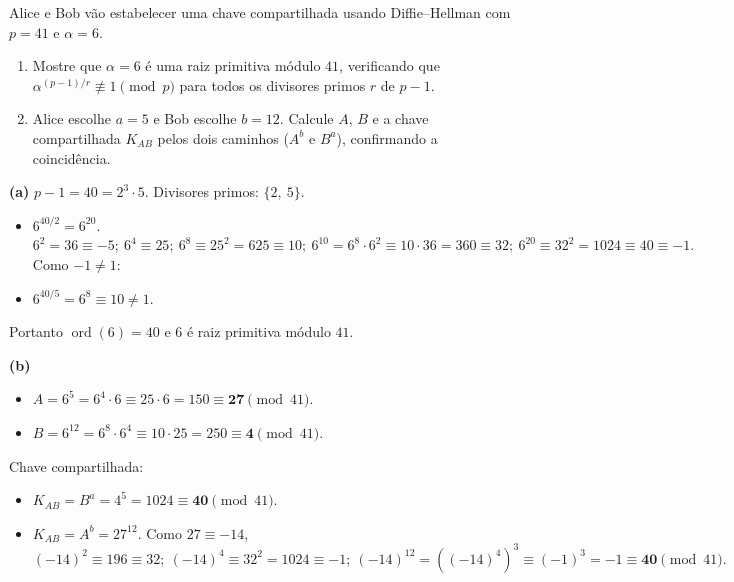 \documentclass[12pt,a4paper]{article}
\begin{document}
\begin{exercicio}
Alice e Bob v\~{a}o estabelecer uma chave compartilhada usando Diffie--Hellman com $p = 41$ e $\alpha = 6$.
\begin{enumerate}[label=(\alph*)]
    \item Mostre que $\alpha = 6$ \'{e} uma raiz primitiva m\'{o}dulo $41$, verificando que $\alpha^{(p-1)/r} \not\equiv 1 \pmod{p}$ para todos os divisores primos $r$ de $p-1$.
    \item Alice escolhe $a = 5$ e Bob escolhe $b = 12$. Calcule $A$, $B$ e a chave compartilhada $K_{AB}$ pelos dois caminhos ($A^{b}$ e $B^{a}$), confirmando a coincid\^{e}ncia.
\end{enumerate}

\begin{resposta}
\textbf{(a)} $p - 1 = 40 = 2^{3} \cdot 5$. Divisores primos: $\{2,\ 5\}$.
\begin{itemize}[leftmargin=1.4em,topsep=2pt,itemsep=1pt]
    \item $6^{40/2} = 6^{20}$. $6^{2} = 36 \equiv -5;\ 6^{4} \equiv 25;\ 6^{8} \equiv 25^{2} = 625 \equiv 10;\ 6^{10} = 6^{8}\cdot 6^{2} \equiv 10 \cdot 36 = 360 \equiv 32;\ 6^{20} \equiv 32^{2} = 1024 \equiv 40 \equiv -1.$ Como $-1 \ne 1$: \checkmark
    \item $6^{40/5} = 6^{8} \equiv 10 \ne 1.$ \checkmark
\end{itemize}
Portanto $\operatorname{ord}(6) = 40$ e $6$ \'{e} raiz primitiva m\'{o}dulo $41$.

\textbf{(b)}
\begin{itemize}[leftmargin=1.4em,topsep=2pt,itemsep=1pt]
    \item $A = 6^{5} = 6^{4} \cdot 6 \equiv 25 \cdot 6 = 150 \equiv \mathbf{27} \pmod{41}.$
    \item $B = 6^{12} = 6^{8} \cdot 6^{4} \equiv 10 \cdot 25 = 250 \equiv \mathbf{4} \pmod{41}.$
\end{itemize}
Chave compartilhada:
\begin{itemize}[leftmargin=1.4em,topsep=2pt,itemsep=1pt]
    \item $K_{AB} = B^{a} = 4^{5} = 1024 \equiv \mathbf{40} \pmod{41}.$
    \item $K_{AB} = A^{b} = 27^{12}$. Como $27 \equiv -14$, $(-14)^{2} \equiv 196 \equiv 32;\ (-14)^{4} \equiv 32^{2} = 1024 \equiv -1;\ (-14)^{12} = ((-14)^{4})^{3} \equiv (-1)^{3} = -1 \equiv \mathbf{40} \pmod{41}.$ \checkmark
\end{itemize}
\end{resposta}
\end{exercicio}
\end{document}
